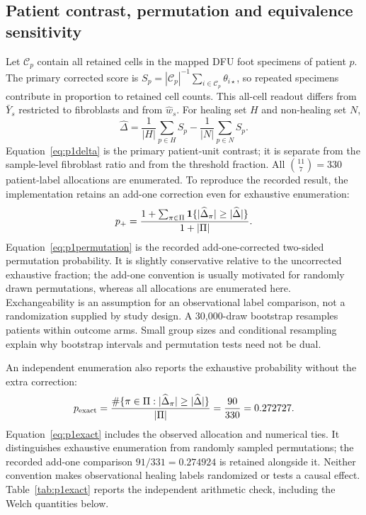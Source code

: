 \subsection{Patient contrast, permutation and equivalence sensitivity}
Let $\mathcal C_p$ contain all retained cells in the mapped DFU foot specimens of patient $p$. The primary corrected score is $S_p=|\mathcal C_p|^{-1}\sum_{i\in\mathcal C_p}\theta_{i\star}$, so repeated specimens contribute in proportion to retained cell counts. This all-cell readout differs from $\bar Y_s$ restricted to fibroblasts and from $\widehat w_s$. For healing set $H$ and non-healing set $N$,
\begin{equation}
\widehat\Delta=\frac1{|H|}\sum_{p\in H}S_p-\frac1{|N|}\sum_{p\in N}S_p.\label{eq:p1delta}
\end{equation}
Equation~\eqref{eq:p1delta} is the primary patient-unit contrast; it is separate from the sample-level fibroblast ratio and from the threshold fraction. All $\binom{11}{7}=330$ patient-label allocations are enumerated. To reproduce the recorded result, the implementation retains an add-one correction even for exhaustive enumeration:
\begin{equation}
p_{+}=\frac{1+\sum_{\pi\in\Pi}\mathbf{1}\{|\widehat\Delta_\pi|\geq|\widehat\Delta|\}}{1+|\Pi|}.\label{eq:p1permutation}
\end{equation}
Equation~\eqref{eq:p1permutation} is the recorded add-one-corrected two-sided permutation probability. It is slightly conservative relative to the uncorrected exhaustive fraction; the add-one convention is usually motivated for randomly drawn permutations, whereas all allocations are enumerated here. Exchangeability is an assumption for an observational label comparison, not a randomization supplied by study design. A 30,000-draw bootstrap resamples patients within outcome arms. Small group sizes and conditional resampling explain why bootstrap intervals and permutation tests need not be dual.

An independent enumeration also reports the exhaustive probability without the extra correction:
\begin{equation}
p_{\rm exact}=\frac{\#\{\pi\in\Pi:|\widehat\Delta_\pi|\geq|\widehat\Delta|\}}{|\Pi|}=\frac{90}{330}=0.272727.\label{eq:p1exact}
\end{equation}
Equation~\eqref{eq:p1exact} includes the observed allocation and numerical ties. It distinguishes exhaustive enumeration from randomly sampled permutations; the recorded add-one comparison $91/331=0.274924$ is retained alongside it. Neither convention makes observational healing labels randomized or tests a causal effect. Table~\ref{tab:p1exact} reports the independent arithmetic check, including the Welch quantities below.

